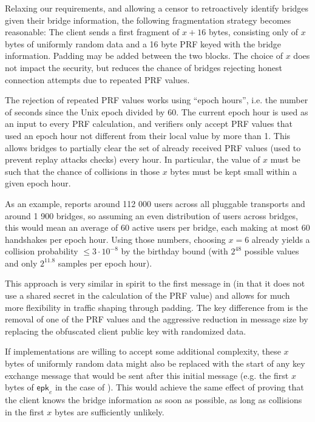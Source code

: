 Relaxing our requirements, and allowing a censor to retroactively identify bridges given their bridge information, the following fragmentation strategy becomes reasonable: The client sends a first fragment of $x+16$ bytes, consisting only of $x$ bytes of uniformly random data and a 16 byte PRF keyed with the bridge information. Padding may be added between the two blocks. The choice of $x$ does not impact the security, but reduces the chance of bridges rejecting honest connection attempts due to repeated PRF values.

The rejection of repeated PRF values works using ``epoch hours'', i.e. the number of seconds since the Unix epoch divided by 60.
The current epoch hour is used as an input to every PRF calculation, and verifiers only accept PRF values that used an epoch hour not different from their local value by more than 1.
This allows bridges to partially clear the set of already received PRF values (used to prevent replay attacks checks) every hour.
In particular, the value of $x$ must be such that the chance of collisions in those $x$ bytes must be kept small within a given epoch hour.

As an example, \cite{tor-metrics} reports around 112 000 users across all pluggable transports and around 1 900 bridges, so assuming an even distribution of users across bridges, this would mean an average of 60 active users per bridge, each making at most 60 handshakes per epoch hour. Using those numbers, choosing $x=6$ already yields a collision probability $\leq 3 \cdot 10^{-8}$ by the birthday bound (with $2^{48}$ possible values and only $2^{11.8}$ samples per epoch hour).

This approach is very similar in spirit to the first message in \obfsfour{} (in that it does not use a shared secret in the calculation of the PRF value) and allows for much more flexibility in traffic shaping through padding. The key difference from \obfsfour{} is the removal of one of the PRF values and the aggressive reduction in message size by replacing the obfuscated client public key with randomized data.

If implementations are willing to accept some additional complexity, these $x$ bytes of uniformly random data might also be replaced with the start of any key exchange message that would be sent after this initial message (e.g. the first $x$ bytes of $\mathsf{epk}_e$ in the case of \drivel{}). This would achieve the same effect of proving that the client knows the bridge information as soon as possible, as long as collisions in the first $x$ bytes are sufficiently unlikely.

